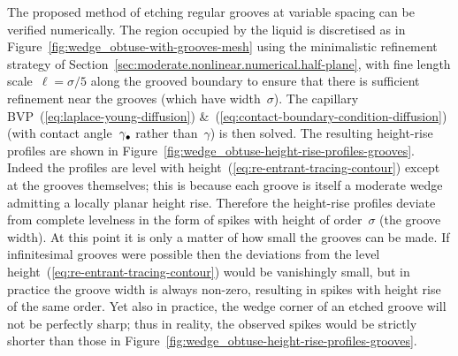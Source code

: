 The proposed method of etching regular grooves at variable spacing
can be verified numerically.
The region occupied by the liquid is discretised
as in Figure~\ref{fig:wedge_obtuse-with-grooves-mesh}
using the minimalistic refinement strategy
of Section~\ref{sec:moderate.nonlinear.numerical.half-plane},
with fine length scale~$\ell = \sigma / 5$
along the grooved boundary
to ensure that there is sufficient refinement near the grooves
(which have width~$\sigma$).
The capillary BVP~(\ref{eq:laplace-young-diffusion})
\&~(\ref{eq:contact-boundary-condition-diffusion})
(with contact angle~$\gamma_\bullet$ rather than~$\gamma$)
is then solved.
The resulting height-rise profiles are shown
in Figure~\ref{fig:wedge_obtuse-height-rise-profiles-grooves}.
Indeed the profiles are level with height~(\ref{eq:re-entrant-tracing-contour})
except at the grooves themselves;
this is because each groove is itself a moderate wedge
admitting a locally planar height rise.
Therefore the height-rise profiles deviate from complete levelness
in the form of spikes with height of order~$\sigma$ (the groove width).
At this point it is only a matter of how small the grooves can be made.
If infinitesimal grooves were possible
then the deviations from the level height~(\ref{eq:re-entrant-tracing-contour})
would be vanishingly small,
but in practice the groove width is always non-zero,
resulting in spikes with height rise of the same order.
Yet also in practice,
the wedge corner of an etched groove will not be perfectly sharp;
thus in reality, the observed spikes would be strictly shorter
than those in Figure~\ref{fig:wedge_obtuse-height-rise-profiles-grooves}.

\begin{figure}
\end{figure}

